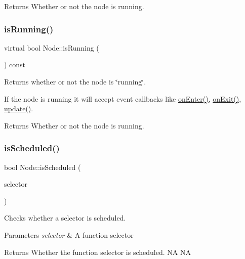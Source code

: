 \begin{DoxyReturn}{Returns}
Whether or not the node is running. 
\end{DoxyReturn}
\mbox{\label{classNode_af5dc885c0dbeceaa3857b52dff68ed4b}} 
\subsubsection{\texorpdfstring{is\+Running()}{isRunning()}\hspace{0.1cm}{\footnotesize\ttfamily [2/2]}}
{\footnotesize\ttfamily virtual bool Node\+::is\+Running (\begin{DoxyParamCaption}{ }\end{DoxyParamCaption}) const\hspace{0.3cm}{\ttfamily [virtual]}}

Returns whether or not the node is \char`\"{}running\char`\"{}.

If the node is running it will accept event callbacks like \hyperlink{classNode_a7f51764c4afd5018a052b9ef71c03374}{on\+Enter()}, \hyperlink{classNode_ac83de835ea315e3179d4293acd8903ac}{on\+Exit()}, \hyperlink{classNode_a32878481ba54b3856ab53c10af13848e}{update()}.

\begin{DoxyReturn}{Returns}
Whether or not the node is running. 
\end{DoxyReturn}
\mbox{\label{classNode_ab9a193072ebab587d1932d8af52050e0}} 
\subsubsection{\texorpdfstring{is\+Scheduled()}{isScheduled()}\hspace{0.1cm}{\footnotesize\ttfamily [1/4]}}
{\footnotesize\ttfamily bool Node\+::is\+Scheduled (\begin{DoxyParamCaption}\item[{S\+E\+L\+\_\+\+S\+C\+H\+E\+D\+U\+LE}]{selector }\end{DoxyParamCaption})}

Checks whether a selector is scheduled.


\begin{DoxyParams}{Parameters}
{\em selector} & A function selector \\
\hline
\end{DoxyParams}
\begin{DoxyReturn}{Returns}
Whether the function selector is scheduled.  NA  NA 
\end{DoxyReturn}
\mbox{\label{classNode_a335b7157808d2c0a38b4de04382749f5}} 

